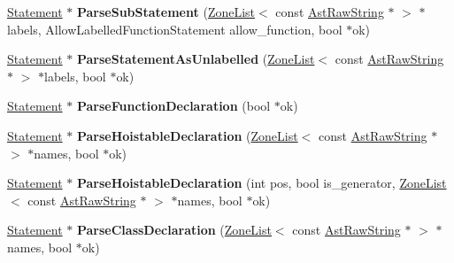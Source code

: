 \begin{DoxyCompactItemize}
\item 
\hyperlink{classv8_1_1internal_1_1_statement}{Statement} $\ast$ {\bfseries Parse\+Sub\+Statement} (\hyperlink{classv8_1_1internal_1_1_zone_list}{Zone\+List}$<$ const \hyperlink{classv8_1_1internal_1_1_ast_raw_string}{Ast\+Raw\+String} $\ast$ $>$ $\ast$labels, Allow\+Labelled\+Function\+Statement allow\+\_\+function, bool $\ast$ok)\hypertarget{classv8_1_1internal_1_1_parser_a36e2c94948e6941c34b80bb3ea7dd3d6}{}\label{classv8_1_1internal_1_1_parser_a36e2c94948e6941c34b80bb3ea7dd3d6}

\item 
\hyperlink{classv8_1_1internal_1_1_statement}{Statement} $\ast$ {\bfseries Parse\+Statement\+As\+Unlabelled} (\hyperlink{classv8_1_1internal_1_1_zone_list}{Zone\+List}$<$ const \hyperlink{classv8_1_1internal_1_1_ast_raw_string}{Ast\+Raw\+String} $\ast$ $>$ $\ast$labels, bool $\ast$ok)\hypertarget{classv8_1_1internal_1_1_parser_a289691217c90a99f35d4da9dfcacf346}{}\label{classv8_1_1internal_1_1_parser_a289691217c90a99f35d4da9dfcacf346}

\item 
\hyperlink{classv8_1_1internal_1_1_statement}{Statement} $\ast$ {\bfseries Parse\+Function\+Declaration} (bool $\ast$ok)\hypertarget{classv8_1_1internal_1_1_parser_aac109898604cb6f1ed9a2ccb6fad38aa}{}\label{classv8_1_1internal_1_1_parser_aac109898604cb6f1ed9a2ccb6fad38aa}

\item 
\hyperlink{classv8_1_1internal_1_1_statement}{Statement} $\ast$ {\bfseries Parse\+Hoistable\+Declaration} (\hyperlink{classv8_1_1internal_1_1_zone_list}{Zone\+List}$<$ const \hyperlink{classv8_1_1internal_1_1_ast_raw_string}{Ast\+Raw\+String} $\ast$ $>$ $\ast$names, bool $\ast$ok)\hypertarget{classv8_1_1internal_1_1_parser_adbb37a790c821610a876029422e92e80}{}\label{classv8_1_1internal_1_1_parser_adbb37a790c821610a876029422e92e80}

\item 
\hyperlink{classv8_1_1internal_1_1_statement}{Statement} $\ast$ {\bfseries Parse\+Hoistable\+Declaration} (int pos, bool is\+\_\+generator, \hyperlink{classv8_1_1internal_1_1_zone_list}{Zone\+List}$<$ const \hyperlink{classv8_1_1internal_1_1_ast_raw_string}{Ast\+Raw\+String} $\ast$ $>$ $\ast$names, bool $\ast$ok)\hypertarget{classv8_1_1internal_1_1_parser_af6cb8193be1b869f48e2389e5be74ca5}{}\label{classv8_1_1internal_1_1_parser_af6cb8193be1b869f48e2389e5be74ca5}

\item 
\hyperlink{classv8_1_1internal_1_1_statement}{Statement} $\ast$ {\bfseries Parse\+Class\+Declaration} (\hyperlink{classv8_1_1internal_1_1_zone_list}{Zone\+List}$<$ const \hyperlink{classv8_1_1internal_1_1_ast_raw_string}{Ast\+Raw\+String} $\ast$ $>$ $\ast$names, bool $\ast$ok)\hypertarget{classv8_1_1internal_1_1_parser_a9feb2cbce1a8e74cda4f6b69728ce7df}{}\label{classv8_1_1internal_1_1_parser_a9feb2cbce1a8e74cda4f6b69728ce7df}


\end{DoxyCompactItemize}
